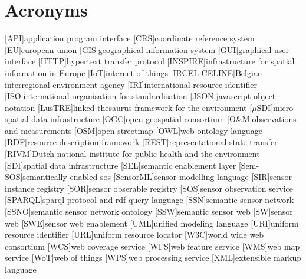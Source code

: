 
\chapter*{Acronyms}

\begin{acronym}[UML]
  [API]{application program interface}
  [CRS]{coordinate reference system} 
  [EU]{european union}
  [GIS]{geographical information system}
  [GUI]{graphical user interface}
  [HTTP]{hypertext transfer protocol}
  [INSPIRE]{infrastructure for spatial information in Europe}
  [IoT]{internet of things}
  [IRCEL-CELINE]{Belgian interregional environment agency}
  [IRI]{international resource identifier}
  [ISO]{international organisation for standardisation}
  [JSON]{javascript object notation}
  [LusTRE]{linked thesaurus framework for the environment} 
  [$\mu$SDI]{micro spatial data infrastructure}
  [OGC]{open geospatial consortium}
  [O\&M]{observations and measurements}
  [OSM]{open streetmap}
  [OWL]{web ontology language}
  [RDF]{resource description framework}
  [REST]{representational state transfer}
  [RIVM]{Dutch national institute for public health and the environment}
  [SDI]{spatial data infrastructure}
  [SEL]{semantic enablement layer}
  [Sem-SOS]{semantically enabled sos}
  [SensorML]{sensor modelling language}
  [SIR]{sensor instance registry}
  [SOR]{sensor obserable registry}
  [SOS]{sensor observation service}
  [SPARQL]{sparql protocol and rdf query language}
  [SSN]{semantic sensor network}
  [SSNO]{semantic sensor network ontology}
  [SSW]{semantic sensor web}
  [SW]{sensor web}
  [SWE]{sensor web enablement}
  [UML]{unified modeling language}
  [URI]{uniform resource identifier}
  [URL]{uniform resource locator}
  [W3C]{world wide web consortium}
  [WCS]{web coverage service}
  [WFS]{web feature service}
  [WMS]{web map service}
  [WoT]{web of things}
  [WPS]{web processing service}
  [XML]{extensible markup language}
\end{acronym}